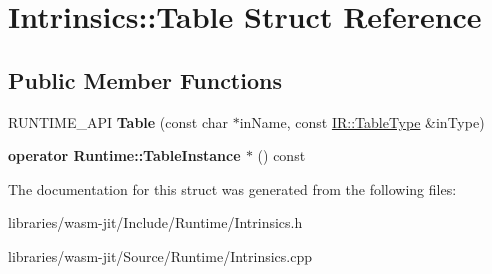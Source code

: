 \hypertarget{struct_intrinsics_1_1_table}{}\section{Intrinsics\+:\+:Table Struct Reference}
\label{struct_intrinsics_1_1_table}
\subsection*{Public Member Functions}
\begin{DoxyCompactItemize}
\item 
\mbox{\label{struct_intrinsics_1_1_table_a687a3a6e58d445b2ca1738e1b21a6482}} 
R\+U\+N\+T\+I\+M\+E\+\_\+\+A\+PI {\bfseries Table} (const char $\ast$in\+Name, const \mbox{\hyperlink{struct_i_r_1_1_table_type}{I\+R\+::\+Table\+Type}} \&in\+Type)
\item 
\mbox{\label{struct_intrinsics_1_1_table_ab49c2df99358b4d37acf93874d1410bd}} 
{\bfseries operator Runtime\+::\+Table\+Instance $\ast$} () const
\end{DoxyCompactItemize}


The documentation for this struct was generated from the following files\+:\begin{DoxyCompactItemize}
\item 
libraries/wasm-\/jit/\+Include/\+Runtime/Intrinsics.\+h\item 
libraries/wasm-\/jit/\+Source/\+Runtime/Intrinsics.\+cpp\end{DoxyCompactItemize}
